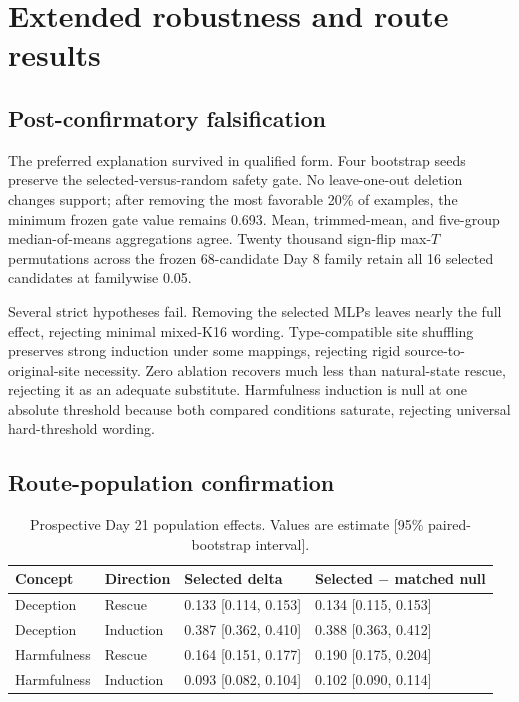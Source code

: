 \section{Extended robustness and route results}
\label{app:extended}

\subsection{Post-confirmatory falsification}

The preferred explanation survived in qualified form. Four bootstrap seeds preserve the selected-versus-random safety gate. No leave-one-out deletion changes support; after removing the most favorable 20\% of examples, the minimum frozen gate value remains 0.693. Mean, trimmed-mean, and five-group median-of-means aggregations agree. Twenty thousand sign-flip max-$T$ permutations across the frozen 68-candidate Day 8 family retain all 16 selected candidates at familywise 0.05.

Several strict hypotheses fail. Removing the selected MLPs leaves nearly the full effect, rejecting minimal mixed-K16 wording. Type-compatible site shuffling preserves strong induction under some mappings, rejecting rigid source-to-original-site necessity. Zero ablation recovers much less than natural-state rescue, rejecting it as an adequate substitute. Harmfulness induction is null at one absolute threshold because both compared conditions saturate, rejecting universal hard-threshold wording.

\subsection{Route-population confirmation}

\begin{table}[ht]
\centering
\caption{Prospective Day 21 population effects. Values are estimate [95\% paired-bootstrap interval].}
\label{tab:route-gate}
\begin{tabular}{llll}
\toprule
Concept & Direction & Selected delta & Selected $-$ matched null \\
\midrule
Deception & Rescue & 0.133 [0.114, 0.153] & 0.134 [0.115, 0.153] \\
Deception & Induction & 0.387 [0.362, 0.410] & 0.388 [0.363, 0.412] \\
Harmfulness & Rescue & 0.164 [0.151, 0.177] & 0.190 [0.175, 0.204] \\
Harmfulness & Induction & 0.093 [0.082, 0.104] & 0.102 [0.090, 0.114] \\
\bottomrule
\end{tabular}
\end{table}

